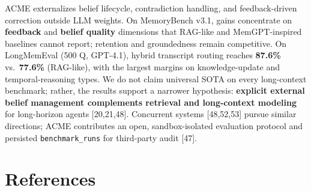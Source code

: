 \documentclass[11pt,a4paper]{article}
\begin{document}
ACME externalizes belief lifecycle, contradiction handling, and
feedback-driven correction outside LLM weights. On MemoryBench v3.1,
gains concentrate on \textbf{feedback} and \textbf{belief quality}
dimensions that RAG-like and MemGPT-inspired baselines cannot report;
retention and groundedness remain competitive. On LongMemEval (500 Q,
GPT-4.1), hybrid transcript routing reaches \textbf{87.6\%}
vs.~\textbf{77.6\%} (RAG-like), with the largest margins on
knowledge-update and temporal-reasoning types. We do not claim universal
SOTA on every long-context benchmark; rather, the results support a
narrower hypothesis: \textbf{explicit external belief management
complements retrieval and long-context modeling} for long-horizon agents
{[}20,21,48{]}. Concurrent systems {[}48,52,53{]} pursue similar
directions; ACME contributes an open, sandbox-isolated evaluation
protocol and persisted \texttt{benchmark\_runs} for third-party audit
{[}47{]}.

\acmeBackMatterBegin
\acmeReferencesBegin

\section{References}\label{references}
\end{document}
